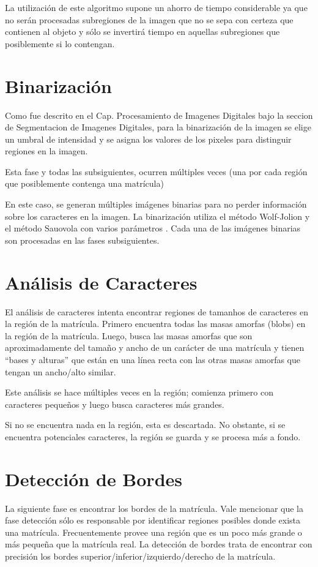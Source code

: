 La utilización de este algoritmo supone un ahorro de tiempo considerable ya que no serán procesadas subregiones de la imagen que no se sepa con certeza que contienen al objeto y sólo se invertirá tiempo en aquellas subregiones que posiblemente si lo contengan. \cite{Viola2001-rh}

\section{Binarización}
Como fue descrito en el Cap. Procesamiento de Imagenes Digitales bajo la seccion de Segmentacion de Imagenes Digitales, para la binarización de la imagen se elige un umbral de intensidad y se asigna los valores de los pixeles para distinguir regiones en la imagen.

Esta fase y todas las subsiguientes, ocurren múltiples veces (una por cada región que posiblemente contenga una matrícula)

En este caso, se generan múltiples imágenes binarias para no perder información sobre los caracteres en la imagen. La binarización utiliza el método Wolf-Jolion y el método Sauovola con varios parámetros \cite{Wolf2004-so,Oliveira2009-io}. Cada una de las imágenes binarias son procesadas en las fases subsiguientes.
\section{Análisis de Caracteres}
El análisis de caracteres intenta encontrar regiones de tamanhos de caracteres en la región de la matrícula. Primero encuentra todas las masas amorfas (blobs) en la región de la matrícula. Luego, busca las masas amorfas que son aproximadamente del tamaño y ancho de un carácter de una matrícula y tienen “bases y alturas” que están en una línea recta con las otras masas amorfas que tengan un ancho/alto similar.

Este análisis se hace múltiples veces en la región; comienza primero con caracteres pequeños y luego busca caracteres más grandes.

Si no se encuentra nada en la región, esta es descartada. No obstante, si se encuentra potenciales caracteres, la región se guarda y se procesa más a fondo.
\section{Detección de Bordes}
La siguiente fase es encontrar los bordes de la matrícula. Vale mencionar que la fase detección sólo es responsable por identificar regiones posibles donde exista una matrícula. Frecuentemente provee una región que es un poco más grande o más pequeña que la matrícula real. La detección de bordes trata de encontrar con precisión los bordes superior/inferior/izquierdo/derecho de la matrícula.

